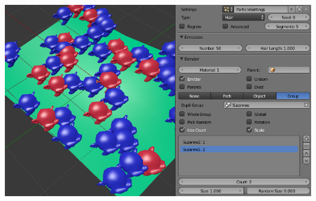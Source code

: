 \documentclass[a4paper,12pt,oneside]{sphinxmanual}
\begin{document}
{\hfill\includegraphics[width=1.000\linewidth]{particles_instancing_setup.jpg}\hfill}

\begin{DUlineblock}{0em}
\item[] 
\end{DUlineblock}
\end{document}

